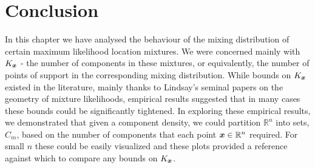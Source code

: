 



\section{Conclusion}

In this chapter we have analysed the behaviour of the mixing distribution of certain maximum likelihood location mixtures. We were concerned mainly with $K_{\bm{{x}}}$ - the number of components in these mixtures, or equivalently, the number of points of support in the corresponding mixing distribution. While bounds on $K_{\bm{{x}}}$ existed in the literature, mainly thanks to Lindsay's seminal papers on the geometry of mixture likelihoods, empirical results suggested that in many cases these bounds could be significantly tightened. In exploring these empirical results, we demonstrated that given a component density, we could partition $\mathbb{R}^n$ into sets, $C_m$, based on the number of components that each point ${\bm{{x}}} \in \mathbb{R}^n$ required. For small $n$ these could be easily visualized and these plots provided a reference against which to compare any bounds on $K_{\bm{{x}}}$.


